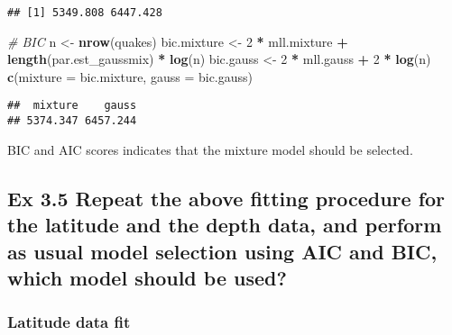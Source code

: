 \documentclass[
]{article}
\newenvironment{Shaded}{\begin{snugshade}}{\end{snugshade}}
\newcommand{\CommentTok}[1]{\textcolor[rgb]{0.56,0.35,0.01}{\textit{#1}}}
\newcommand{\DataTypeTok}[1]{\textcolor[rgb]{0.13,0.29,0.53}{#1}}
\newcommand{\DecValTok}[1]{\textcolor[rgb]{0.00,0.00,0.81}{#1}}
\newcommand{\KeywordTok}[1]{\textcolor[rgb]{0.13,0.29,0.53}{\textbf{#1}}}
\newcommand{\NormalTok}[1]{#1}
\newcommand{\OperatorTok}[1]{\textcolor[rgb]{0.81,0.36,0.00}{\textbf{#1}}}
\newcommand{\OtherTok}[1]{\textcolor[rgb]{0.56,0.35,0.01}{#1}}
\newcommand{\StringTok}[1]{\textcolor[rgb]{0.31,0.60,0.02}{#1}}
\begin{document}
\begin{verbatim}
## [1] 5349.808 6447.428
\end{verbatim}

\begin{Shaded}
\begin{Highlighting}[]
\CommentTok{# BIC}
\NormalTok{n <-}\StringTok{ }\KeywordTok{nrow}\NormalTok{(quakes)}
\NormalTok{bic.mixture <-}\StringTok{ }\DecValTok{2} \OperatorTok{*}\StringTok{ }\NormalTok{mll.mixture }\OperatorTok{+}\StringTok{ }\KeywordTok{length}\NormalTok{(par.est_gaussmix) }\OperatorTok{*}\StringTok{ }\KeywordTok{log}\NormalTok{(n)}
\NormalTok{bic.gauss <-}\StringTok{ }\DecValTok{2} \OperatorTok{*}\StringTok{ }\NormalTok{mll.gauss }\OperatorTok{+}\StringTok{ }\DecValTok{2} \OperatorTok{*}\StringTok{ }\KeywordTok{log}\NormalTok{(n)}
\KeywordTok{c}\NormalTok{(}\DataTypeTok{mixture =}\NormalTok{ bic.mixture, }\DataTypeTok{gauss =}\NormalTok{ bic.gauss)}
\end{Highlighting}
\end{Shaded}

\begin{verbatim}
##  mixture    gauss 
## 5374.347 6457.244
\end{verbatim}

BIC and AIC scores indicates that the mixture model should be selected.

\hypertarget{ex-3.5-repeat-the-above-uxfb01tting-procedure-for-the-latitude-and-the-depth-data-and-perform-as-usual-model-selection-using-aic-and-bic-which-model-should-be-used}{%
\subsection{Ex 3.5 Repeat the above ﬁtting procedure for the latitude
and the depth data, and perform as usual model selection using AIC and
BIC, which model should be
used?}\label{ex-3.5-repeat-the-above-uxfb01tting-procedure-for-the-latitude-and-the-depth-data-and-perform-as-usual-model-selection-using-aic-and-bic-which-model-should-be-used}}

\hypertarget{latitude-data-fit}{%
\subsubsection{Latitude data fit}\label{latitude-data-fit}}

\begin{Shaded}
\end{Shaded}
\end{document}
